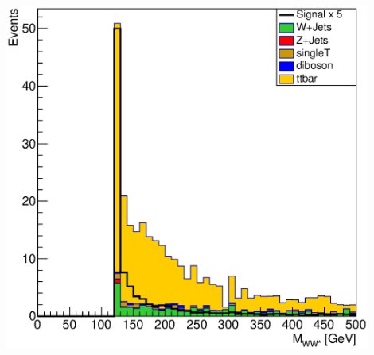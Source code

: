 \documentclass{beamer}
\begin{document}
\begin{frame}
\begin{columns}
\begin{column}{0.5\textwidth}
\begin{center}
\includegraphics[width=0.9\textwidth]{figures/JohnPlots_5_24/muon/hww_m/hww_m_Xhh2000sigbkg_fatjet}
\end{center}
\end{column}
\end{columns}
\end{frame}
\end{document}

